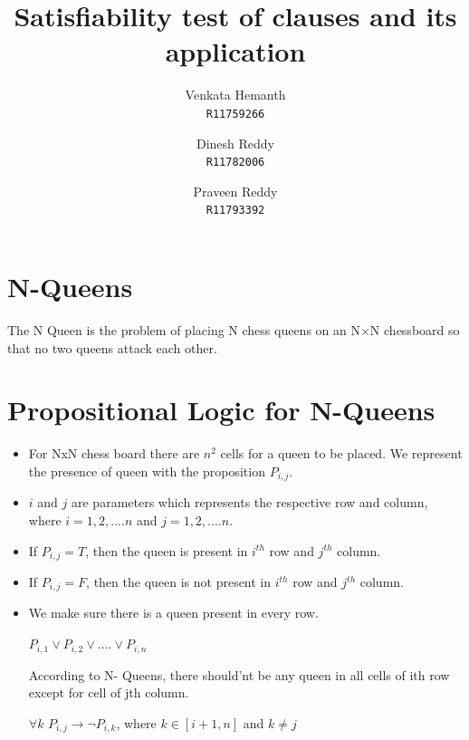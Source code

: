 \documentclass{article}
\title{\textbf{Satisfiability test of clauses and its application}}
\author{
    Venkata Hemanth\\
    \texttt{R11759266} \and
    Dinesh Reddy\\
    \texttt{R11782006} \and
    Praveen Reddy\\
    \texttt{R11793392}
}
\begin{document}
\maketitle

\section{N-Queens}
\large The N Queen is the problem of placing N chess queens on an N×N chessboard so that no two queens attack each other.
\section{Propositional Logic for N-Queens}
\begin{itemize}
    \item For NxN chess board there are $n^2$ cells for a queen to be placed. We represent the presence of queen with the proposition $P_{i,j}$.
    \item  $i$ and $j$ are parameters which represents the respective row and column, where $i = 1,2,....n$ and $j = 1,2,....n$.
    \item If $P_{i,j} = T$, then the queen is present in $i^{th}$ row and $j^{th}$ column.
    \item  If $ P_{i,j} = F$, then the queen is not present in $i^{th}$ row and $j^{th}$ column.
   
    \item We make sure there is a queen present in every row.
    \begin{center}
        $ P_{i,1} \lor P_{i,2} \lor.... \lor P_{i,n} $
    \end{center}
    According to N- Queens, there should'nt be any queen in all cells of ith row except for cell of jth column.
    \begin{center} {$\forall k$ $P_{i,j} \rightarrow \neg P_{i,k}$, where $k \in [i+1,n]$ and $k \neq j$}
    \end{center}
   

\end{itemize}
\end{document}
